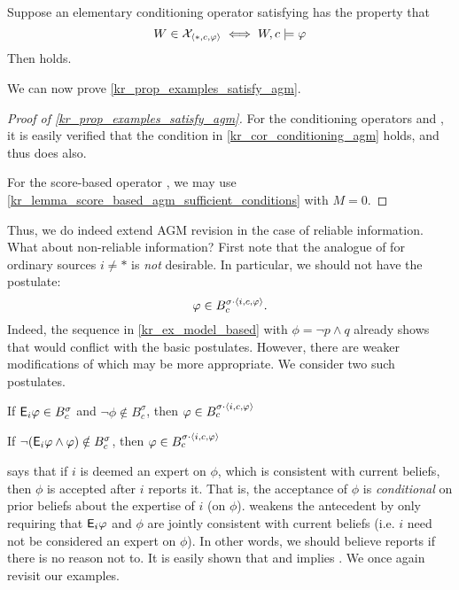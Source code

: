 \begin{corollary}
    \label{kr_cor_conditioning_agm}
    Suppose an elementary conditioning operator satisfying \kconj{} has the
    property that
    \[
        W \in \mathcal{X}_{\langle {\ast, c, \varphi} \rangle} \iff W, c \models \varphi
    \]
    Then \agm{} holds.
\end{corollary}

We can now prove \cref{kr_prop_examples_satisfy_agm}.

\begin{proof}[Proof of \cref{kr_prop_examples_satisfy_agm}]
    For the conditioning operators \varbasedcond{} and \partbasedcond{}, it is
    easily verified that the condition in \cref{kr_cor_conditioning_agm} holds,
    and thus \agm{} does also.

    For the score-based operator \scorebasedop{}, we may use
    \cref{kr_lemma_score_based_agm_sufficient_conditions} with $M = 0 $.
\end{proof}

Thus, we do indeed extend AGM revision in the case of reliable information.
What about non-reliable information? First note that the analogue of \agm{} for
ordinary sources $i \ne \ast$ is \emph{not} desirable. In particular, we
should not have the  postulate:
\[
    \varphi \in B^{\sigma \cdot \langle {i, c, \varphi} \rangle}_c.
\]
Indeed, the sequence in \cref{kr_ex_model_based} with $\phi = \neg p
\land q$ already shows that  would conflict with the
basic postulates.
%
However, there are weaker modifications of  which may be
more appropriate. We consider two such postulates.

\begin{postulate}[\condsucc{}]
    If $\mathsf{E}_i\varphi \in B^\sigma_c$ and $\neg\phi \notin B^\sigma_c$, then $\varphi
    \in B^{\sigma \cdot \langle {i, c, \varphi} \rangle}_c$
\end{postulate}

\begin{postulate}[\strongcondsucc{}]
    If $\neg(\mathsf{E}_i\varphi \land \varphi) \notin B^\sigma_c$, then $\varphi \in B^{\sigma
    \cdot \langle {i, c, \varphi} \rangle}_c$
\end{postulate}

\condsucc{} says that if $i$ is deemed an expert on $\phi$, which is consistent
with current beliefs, then $\phi$ is accepted after $i$ reports it. That is,
the acceptance of $\phi$ is \emph{conditional} on prior beliefs about the expertise of
$i$ (on $\phi$). \strongcondsucc{} weakens the antecedent by only requiring
that $\mathsf{E}_i\varphi$ and $\phi$ are jointly consistent with current beliefs (i.e.
$i$ need not be considered an expert on $\phi$). In other words, we should
believe reports if there is no reason not to. It is easily shown that
\closure{} and \strongcondsucc{} implies \condsucc{}.
%
We once again revisit our examples. 

